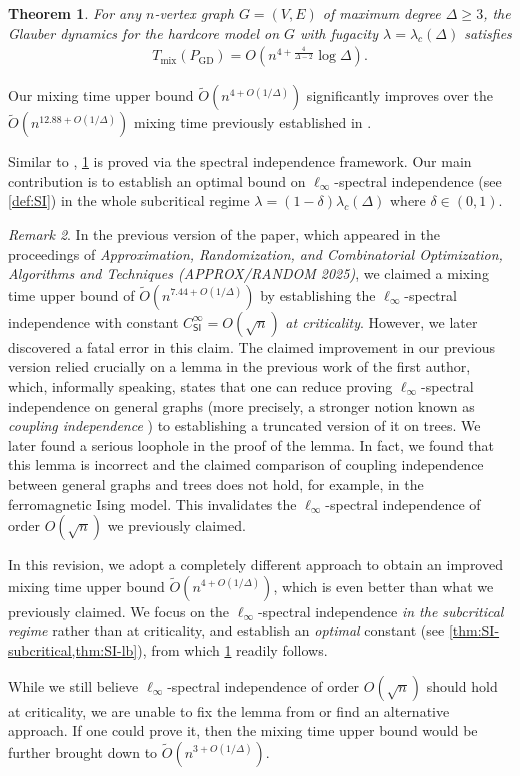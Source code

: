 \documentclass[11pt]{article}
\theoremstyle{plain}
\newtheorem{theorem}{Theorem}[section]
\theoremstyle{definition}
\theoremstyle{remark}
\newtheorem{remark}[theorem]{Remark}
\newcommand{\SI}{\mathsf{SI}}
\begin{document}
\begin{theorem}
	\label{thm:main}
	For any $n$-vertex graph $G=(V,E)$ of maximum degree $\Delta \ge 3$, the Glauber dynamics for the hardcore model on $G$ with fugacity $\lambda = \lambda_c(\Delta)$ satisfies
	\begin{align*}
		T_{\mathrm{mix}}(P_{\mathrm{GD}}) =  O\left( n^{4+\frac{4}{\Delta-2}} \log \Delta\right).
	\end{align*}
\end{theorem}

Our mixing time upper bound $\tilde{O}(n^{4 + O(1/\Delta)})$ significantly improves over the $\tilde{O}(n^{12.88+O(1/\Delta)})$ mixing time previously established in \cite{CCYZ24}.

Similar to \cite{CCYZ24}, \cref{thm:main} is proved via the spectral independence framework.
Our main contribution is to establish an optimal bound on $\ell_\infty$-spectral independence (see \cref{def:SI}) in the whole subcritical regime $\lambda = (1-\delta)\lambda_c(\Delta)$ where $\delta \in (0,1)$.

\begin{remark}
    In the previous version of the paper, which appeared in the proceedings of \emph{Approximation, Randomization, and Combinatorial Optimization, Algorithms and Techniques (APPROX/RANDOM 2025)}, we claimed a mixing time upper bound of $\tilde{O}(n^{7.44+O(1/\Delta)})$ by establishing the $\ell_\infty$-spectral independence with constant $C_\SI^\infty = O(\sqrt{n})$ \emph{at criticality}. 
    However, we later discovered a fatal error in this claim.
    The claimed improvement in our previous version relied crucially on a lemma in the previous work \cite{CCYZ24} of the first author, which, informally speaking, states that one can reduce proving $\ell_\infty$-spectral independence on general graphs (more precisely, a stronger notion known as \emph{coupling independence} \cite{chen2023near}) to establishing a truncated version of it on trees. We later found a serious loophole in the proof of the lemma. In fact, we found that this lemma is incorrect and the claimed comparison of coupling independence between general graphs and trees does not hold, for example, in the ferromagnetic Ising model. 
    This invalidates the $\ell_\infty$-spectral independence of order $O(\sqrt{n})$ we previously claimed.

    In this revision, we adopt a completely different approach to obtain an improved mixing time upper bound $\tilde{O}(n^{4+O(1/\Delta)})$, which is even better than what we previously claimed. We focus on the $\ell_\infty$-spectral independence \emph{in the subcritical regime} rather than at criticality, and establish an \emph{optimal} constant (see \cref{thm:SI-subcritical,thm:SI-lb}), from which \cref{thm:main} readily follows.

    While we still believe $\ell_\infty$-spectral independence of order $O(\sqrt{n})$ should hold at criticality, we are unable to fix the lemma from \cite{CCYZ24} or find an alternative approach. If one could prove it, then the mixing time upper bound would be further brought down to $\tilde{O}(n^{3+O(1/\Delta)})$.
\end{remark}
\end{document}
